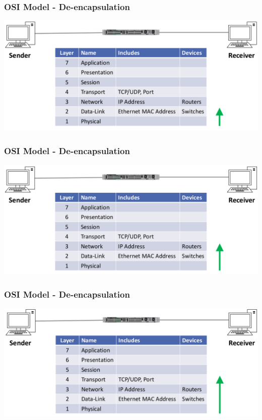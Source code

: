 \documentclass[pdflatex,compress]{beamer}
\begin{document}
\begin{frame}
	\frametitle{OSI Model - De-encapsulation}
	\begin{center}
		\includegraphics[width=\linewidth]{img/img11}
	\end{center}
\end{frame}

\begin{frame}
	\frametitle{OSI Model - De-encapsulation}
	\begin{center}
		\includegraphics[width=\linewidth]{img/img12}
	\end{center}
\end{frame}

\begin{frame}
	\frametitle{OSI Model - De-encapsulation}
	\begin{center}
		\includegraphics[width=\linewidth]{img/img13}
	\end{center}
\end{frame}
\end{document}
